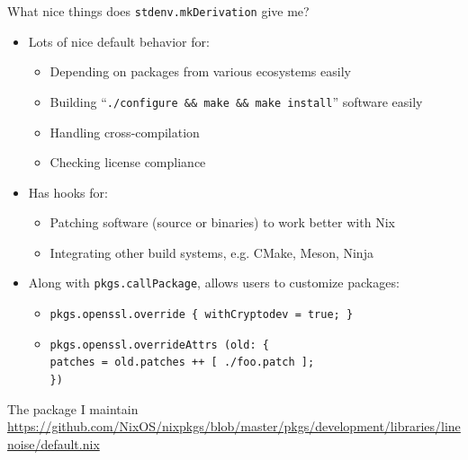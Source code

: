 \documentclass[aspectratio=169, notes]{beamer}
\begin{document}
\begin{frame}{What nice things does \texttt{stdenv.mkDerivation} give me?}
	\begin{itemize}
		\item Lots of nice default behavior for:
		      \begin{itemize}
			      \item Depending on packages from various ecosystems easily
			      \item Building ``\texttt{./configure \&\& make \&\& make install}'' software easily
			      \item Handling cross-compilation
			      \item Checking license compliance
		      \end{itemize}
		\item Has hooks for:
		      \begin{itemize}
			      \item Patching software (source or binaries) to work better with Nix
			      \item Integrating other build systems, e.g. CMake, Meson, Ninja
		      \end{itemize}
		\item Along with \texttt{pkgs.callPackage}, allows users to customize packages:
		      \begin{itemize}
			      \item \texttt{pkgs.openssl.override \{ withCryptodev = true; \}}
			      \item \texttt{pkgs.openssl.overrideAttrs (old: \{} \\
			            \hspace{1cm}\texttt{patches = old.patches ++ [ ./foo.patch ];} \\
			            \texttt{\})} \\
		      \end{itemize}
	\end{itemize}
\end{frame}

\begin{frame}{The package I maintain}
	\url{https://github.com/NixOS/nixpkgs/blob/master/pkgs/development/libraries/linenoise/default.nix}
\end{frame}
\end{document}
